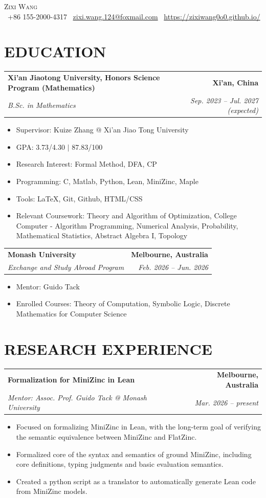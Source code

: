 \documentclass[a4paper,11pt]{article}
\makeatletter
\newcommand{\resumeSubheading}[4]{
  \vspace{2pt}
  \begin{tabular*}{\textwidth}{l@{\extracolsep{\fill}}r}
    \textbf{#1} & \textbf{#2} \\
    \textit{#3} & \textit{#4} \\
  \end{tabular*}
  \vspace{-4pt}
}
\newcommand{\resumeItem}[1]{
  \item\small{#1}
}
\newcommand{\resumeItemListStart}{
  \begin{itemize}[leftmargin=0.18in]
}
\newcommand{\resumeItemListEnd}{
  \end{itemize}\vspace{-4pt}
}
\makeatother
\begin{document}
\begin{center}
    {\fontsize{24}{28}\selectfont\textsc{Zixi Wang}} \\[6pt]
    \faPhone \ +86 155-2000-4317
    \quad
    \faEnvelope \ \href{mailto:zixi.wang.124@foxmail.com}{zixi.wang.124@foxmail.com}
    \quad
    \faGlobe \ \href{https://zixiwang0o0.github.io/}{https://zixiwang0o0.github.io/}
\end{center}

\section{EDUCATION}

\resumeSubheading
{Xi'an Jiaotong University, Honors Science Program (Mathematics)}
{Xi'an, China}
{B.Sc. in Mathematics}
{Sep. 2023 -- Jul. 2027 (expected)}

\resumeItemListStart
  \resumeItem{Supervisor: Kuize Zhang @ Xi'an Jiao Tong University}
  \resumeItem{GPA: 3.73/4.30 $|$ 87.83/100}
  \resumeItem{Research Interest: Formal Method, DFA, CP}
  \resumeItem{Programming: C, Matlab, Python, Lean, MiniZinc, Maple}
  \resumeItem{Tools: LaTeX, Git, Github, HTML/CSS}
  \resumeItem{Relevant Coursework: Theory and Algorithm of Optimization, College Computer - Algorithm Programming, Numerical Analysis, Probability, Mathematical Statistics, Abstract Algebra I, Topology}
\resumeItemListEnd

\resumeSubheading
{Monash University}
{Melbourne, Australia}
{Exchange and Study Abroad Program}
{Feb. 2026 -- Jun. 2026}

\resumeItemListStart
  \resumeItem{Mentor: Guido Tack}
  \resumeItem{Enrolled Courses: Theory of Computation, Symbolic Logic, Discrete Mathematics for Computer Science}
\resumeItemListEnd

\section{RESEARCH EXPERIENCE}

\resumeSubheading
{Formalization for MiniZinc in Lean}
{Melbourne, Australia}
{Mentor: Assoc. Prof. Guido Tack @ Monash University}
{Mar. 2026 -- present}

\resumeItemListStart
  \resumeItem{Focused on formalizing MiniZinc in Lean, with the long-term goal of verifying the semantic equivalence between MiniZinc and FlatZinc.}
  \resumeItem{Formalized core of the syntax and semantics of ground MiniZinc, including core definitions, typing judgments and basic evaluation semantics.}
  \resumeItem{Created a python script as a translator to automatically generate Lean code from MiniZinc models.}
\resumeItemListEnd
\end{document}

